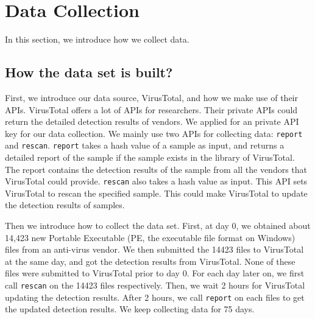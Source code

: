 \section{Data Collection}%












In this section, we introduce how we collect data. 

\subsection{How the data set is built?}

First, we introduce our data source, VirusTotal, and how we make use of their APIs. VirusTotal offers a lot of APIs for researchers. Their private APIs could return the detailed detection results of vendors. We applied for an private API key for our data collection. We mainly use two APIs for collecting data: \texttt{report} and \texttt{rescan}. \texttt{report} takes a hash value of a sample as input, and returns a detailed report of the sample if the sample exists in the library of VirusTotal. The report contains the detection results of the sample from all the vendors that VirusTotal could provide. \texttt{rescan} also takes a hash value as input. This API sets VirusTotal to rescan the specified sample. This could make VirusTotal to update the detection results of samples.

Then we introduce how to collect the data set. 
First, at day 0, we obtained about 14,423 new Portable Executable (PE, the executable file format on Windows) files from an anti-virus vendor. 
We then submitted the 14423 files to VirusTotal at the same day, and got the detection results from VirusTotal. 
None of these files were submitted to VirusTotal prior to day 0.
For each day later on, we first call \texttt{rescan} on the 14423 files respectively. Then, we wait 2 hours for VirusTotal updating the detection results. 
After 2 hours, we call \texttt{report} on each files to get the updated detection results. 
We keep collecting data for 75 days. 

